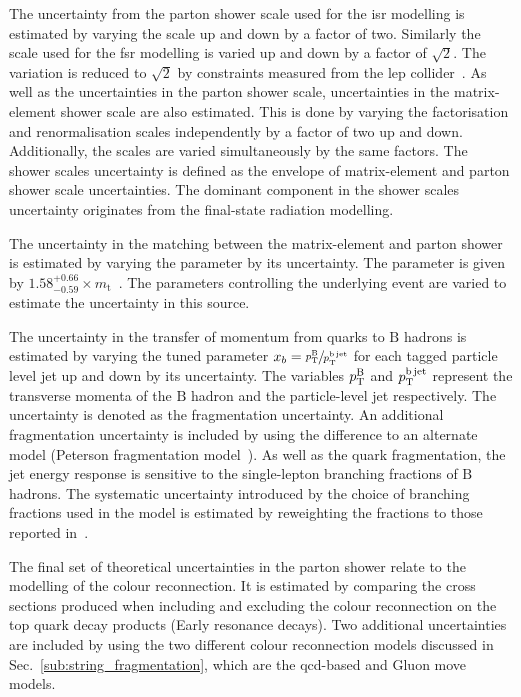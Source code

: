 The uncertainty from the parton shower scale used for the \acrshort{isr} modelling is estimated by varying the scale up and down by a factor of two.
Similarly the scale used for the \acrshort{fsr} modelling is varied up and down by a factor of $\sqrt{2}$.
The variation is reduced to $\sqrt{2}$ by constraints measured from the \acrshort{lep} collider~\cite{Sys:FSR}.
As well as the uncertainties in the parton shower scale, uncertainties in the matrix-element shower scale are also estimated.
This is done by varying the factorisation and renormalisation scales independently by a factor of two up and down. 
Additionally, the scales are varied simultaneously by the same factors.
The shower scales uncertainty is defined as the envelope of matrix-element and parton shower scale uncertainties.
The dominant component in the shower scales uncertainty originates from the final-state radiation modelling.

The uncertainty in the matching between the matrix-element and parton shower is estimated by varying the \hdamp{} parameter by its uncertainty.
The \hdamp{} parameter is given by $1.58^{+0.66}_{-0.59}\times m_{\mathrm{t}}$~\cite{Gen:CUETP8M2T4}.
The parameters controlling the underlying event are varied to estimate the uncertainty in this source.

The uncertainty in the transfer of momentum from \bquark{} quarks to $\mathrm{B}$ hadrons is estimated by varying the tuned parameter $x_{b} = \sfrac{p_{\mathrm{T}}^{\mathrm{B}}}{p_{\mathrm{T}}^{\mathrm{b\,jet}}}$ for each tagged particle level \bquark{} jet up and down by its uncertainty.
The variables $p_{\mathrm{T}}^{\mathrm{B}}$ and $p_{\mathrm{T}}^{\mathrm{b\,jet}}$ represent the transverse momenta of the $\mathrm{B}$ hadron and the particle-level \bquark{} jet respectively.
The uncertainty is denoted as the fragmentation uncertainty.
An additional fragmentation uncertainty is included by using the difference to an alternate model (Peterson fragmentation model~\cite{Sys:PFrag}).
As well as the \bquark{} quark fragmentation, the \bquark{} jet energy response is sensitive to the single-lepton branching fractions of $\mathrm{B}$ hadrons.
The systematic uncertainty introduced by the choice of branching fractions used in the \powhegpythia{} model is estimated by reweighting the fractions to those reported in~\cite{PDG}.

The final set of theoretical uncertainties in the parton shower relate to the modelling of the colour reconnection.
It is estimated by comparing the cross sections produced when including and excluding the colour reconnection on the top quark decay products (Early resonance decays).
Two additional uncertainties are included by using the two different colour reconnection models discussed in Sec.~\ref{sub:string_fragmentation}, which are the \acrshort{qcd}-based and Gluon move models.

